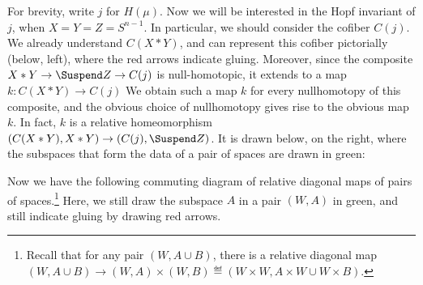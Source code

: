For brevity, write $j$ for $H(\mu)$. Now we will be interested in the Hopf invariant of $j$, when $X=Y=Z=S^{n-1}$. In particular, we should consider the cofiber $C(j)$. We already understand $C(X\ast Y)$, and can represent this cofiber pictorially (below, left), where the red arrows indicate gluing. Moreover, since the composite $X \ast Y \to \Suspend Z \to C(j)$ is null-homotopic, it extends to a  map $k:C(X\ast Y)\to C(j)$
We obtain such a map $k$ for every nullhomotopy of this composite, and the obvious choice of nullhomotopy gives rise to the obvious map $k$.
In fact, $k$ is a relative homeomorphism $(C(X\ast Y),X\ast Y)\to (C(j),\Suspend Z)$.
It is drawn below, on the right, where the subspaces that form the data of a pair of spaces are drawn in green:
\begin{center}
\end{center}
%
%
Now we have the following commuting diagram of relative diagonal maps of pairs of spaces.\footnote{Recall that for any pair $(W,A\cup B)$, there is a relative diagonal map $(W,A\cup B)\to (W,A)\times (W,B)\eqdef(W\times W,A\times W\cup W\times B)$.} Here, we still draw the subspace $A$ in a pair $(W,A)$ in green, and still indicate gluing by drawing red arrows.
